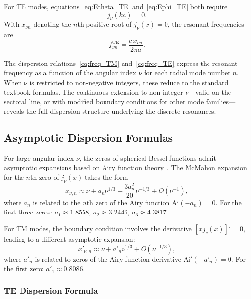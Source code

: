 \documentclass[
  aip,
  amsmath,amssymb,
  preprint
]{revtex4-1}
\begin{document}
For TE modes, equations~\eqref{eq:Etheta_TE} and~\eqref{eq:Ephi_TE} both require
\begin{equation}
j_\nu(ka) = 0.
\label{eq:BC_TE}
\end{equation}
With $x_{\nu n}$ denoting the $n$th positive root of $j_\nu(x) = 0$, the resonant frequencies are
\begin{equation}
f_{\nu n}^{\text{TE}} = \frac{c \, x_{\nu n}}{2\pi a}.
\label{eq:freq_TE}
\end{equation}

The dispersion relations~\eqref{eq:freq_TM} and~\eqref{eq:freq_TE} express the resonant frequency as a function of the angular index $\nu$ for each radial mode number $n$. When $\nu$ is restricted to non-negative integers, these reduce to the standard textbook formulas. The continuous extension to non-integer $\nu$---valid on the sectoral line, or with modified boundary conditions for other mode families---reveals the full dispersion structure underlying the discrete resonances.


\subsection{Asymptotic Dispersion Formulas}

For large angular index $\nu$, the zeros of spherical Bessel functions admit asymptotic expansions based on Airy function theory~\cite{Abramowitz1964, DLMF}. The McMahon expansion for the $n$th zero of $j_\nu(x)$ takes the form
\begin{equation}
x_{\nu,n} \approx \nu + a_n \nu^{1/3} + \frac{3a_n^2}{20}\nu^{-1/3} + O(\nu^{-1}),
\label{eq:bessel_zero_asymptotic}
\end{equation}
where $a_n$ is related to the $n$th zero of the Airy function $\mathrm{Ai}(-a_n) = 0$. For the first three zeros: $a_1 \approx 1.8558$, $a_2 \approx 3.2446$, $a_3 \approx 4.3817$.

For TM modes, the boundary condition involves the derivative $[xj_\nu(x)]' = 0$, leading to a different asymptotic expansion:
\begin{equation}
x'_{\nu,n} \approx \nu + a'_n \nu^{1/3} + O(\nu^{-1/3}),
\label{eq:bessel_deriv_zero_asymptotic}
\end{equation}
where $a'_n$ is related to zeros of the Airy function derivative $\mathrm{Ai}'(-a'_n) = 0$. For the first zero: $a'_1 \approx 0.8086$.

\subsubsection{TE Dispersion Formula}
\end{document}
